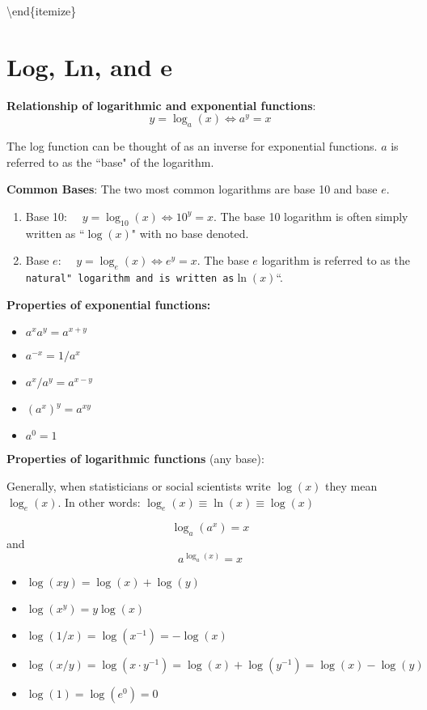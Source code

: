\documentclass[]{book}
\providecommand{\tightlist}{%
  \setlength{\itemsep}{0pt}\setlength{\parskip}{0pt}}
\theoremstyle{definition}
\theoremstyle{definition}
\theoremstyle{definition}
\theoremstyle{remark}
\begin{document}
\textbackslash{}end\{itemize\}

\section{Log, Ln, and e}\label{log-ln-and-e}

\textbf{Relationship of logarithmic and exponential functions}:
\[y=\log_a(x) \iff a^y=x\]

The log function can be thought of as an inverse for exponential
functions. \(a\) is referred to as the ``base" of the logarithm.

\textbf{Common Bases}: The two most common logarithms are base 10 and
base \(e\).

\begin{enumerate}
\def\labelenumi{\arabic{enumi}.}
\tightlist
\item
  Base 10: \(\quad y=\log_{10}(x) \iff 10^y=x\). The base 10 logarithm
  is often simply written as ``\(\log(x)\)" with no base denoted.
\item
  Base \(e\): \(\quad y=\log_e(x) \iff e^y=x\). The base \(e\) logarithm
  is referred to as the
  \texttt{natural"\ logarithm\ and\ is\ written\ as}\(\ln(x)\)``.
\end{enumerate}

\begin{comment}
            {\texttt{[image: ln.eps]}} \,  {\texttt{[image: exp.eps]}}
            \end{comment}

\textbf{Properties of exponential functions:}

\begin{itemize}
\tightlist
\item
  \(a^x a^y = a^{x+y}\)
\item
  \(a^{-x} = 1/a^x\)
\item
  \(a^x/a^y = a^{x-y}\)
\item
  \((a^x)^y = a^{x y}\)
\item
  \(a^0 = 1\)
\end{itemize}

\textbf{Properties of logarithmic functions} (any base):

Generally, when statisticians or social scientists write \(\log(x)\)
they mean \(\log_e(x)\). In other words:
\(\log_e(x) \equiv \ln(x) \equiv \log(x)\)

\[\log_a(a^x)=x\] and \[a^{\log_a(x)}=x\]

\begin{itemize}
\tightlist
\item
  \(\log(x y)=\log(x)+\log(y)\)
\item
  \(\log(x^y)=y\log(x)\)
\item
  \(\log(1/x)=\log(x^{-1})=-\log(x)\)
\item
  \(\log(x/y)=\log(x\cdot y^{-1})=\log(x)+\log(y^{-1})=\log(x)-\log(y)\)
\item
  \(\log(1)=\log(e^0)=0\)
\end{itemize}
\end{document}
